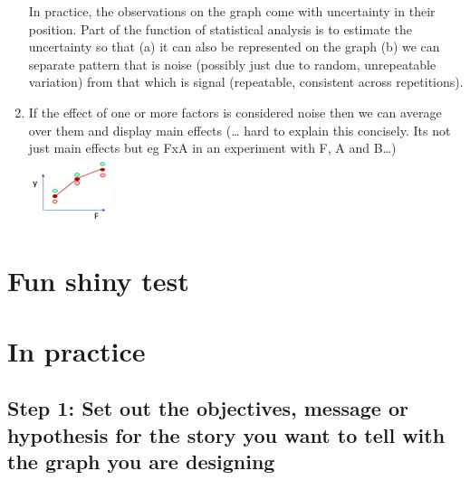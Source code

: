 \documentclass[
]{book}
\begin{document}
\begin{enumerate}
  In practice, the observations on the graph come with uncertainty in their position. Part of the function of statistical analysis is to estimate the uncertainty so that (a) it can also be represented on the graph (b) we can separate pattern that is noise (possibly just due to random, unrepeatable variation) from that which is signal (repeatable, consistent across repetitions).
\item
  If the effect of one or more factors is considered noise then we can average over them and display main effects (\ldots{} hard to explain this concisely. Its not just main effects but eg FxA in an experiment with F, A and B\ldots)
  \includegraphics{img/Picture4.jpg}
\end{enumerate}

\hypertarget{fun-shiny-test}{%
\section{Fun shiny test}\label{fun-shiny-test}}

\hypertarget{in-practice}{%
\section{In practice}\label{in-practice}}

\hypertarget{step-1-set-out-the-objectives-message-or-hypothesis-for-the-story-you-want-to-tell-with-the-graph-you-are-designing}{%
\subsection{Step 1: Set out the objectives, message or hypothesis for the story you want to tell with the graph you are designing}\label{step-1-set-out-the-objectives-message-or-hypothesis-for-the-story-you-want-to-tell-with-the-graph-you-are-designing}}
\end{document}
